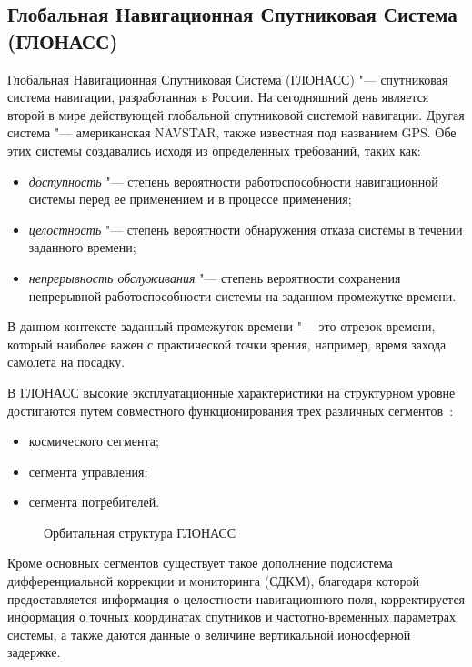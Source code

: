 \documentclass[../main.tex]{subfiles}
\begin{document}
\subsection{Глобальная Навигационная Спутниковая Система (ГЛОНАСС)}
Глобальная Навигационная Спутниковая Система (ГЛОНАСС) "--- спутниковая система навигации, разработанная в России. На сегодняшний день является второй в мире действующей глобальной спутниковой системой навигации. Другая система "--- американская NAVSTAR, также известная под названием GPS. Обе этих системы создавались исходя из определенных требований, таких как:
\begin{itemize}
    \item \textit{доступность} "--- степень вероятности работоспособности навигационной системы перед ее применением и в процессе применения;
    \item \textit{целостность} "--- степень вероятности обнаружения отказа системы в течении заданного времени;
    \item \textit{непрерывность обслуживания} "--- степень вероятности сохранения непрерывной работоспособности системы на заданном промежутке времени.
\end{itemize}
В данном контексте заданный промежуток времени "--- это отрезок времени, который наиболее важен с практической точки зрения, например, время захода самолета на посадку.

В ГЛОНАСС высокие эксплуатационные характеристики на структурном уровне достигаются путем совместного функционирования трех различных сегментов~\cite{YATSENKOV:2005}:
\begin{itemize}
    \item космического сегмента;
    \item сегмента управления;
    \item сегмента потребителей.
\end{itemize}

\begin{figure}[tb]
    \begin{center}


    \caption{Орбитальная структура ГЛОНАСС}
    \label{fig:glonass:pic1}
    \end{center}
\end{figure}

Кроме основных сегментов существует такое дополнение подсистема дифференциальной коррекции и мониторинга (СДКМ), благодаря которой предоставляется информация о целостности навигационного поля, корректируется информация о точных координатах спутников и частотно-временных параметрах системы, а также даются данные о величине вертикальной ионосферной задержке.
\end{document}
